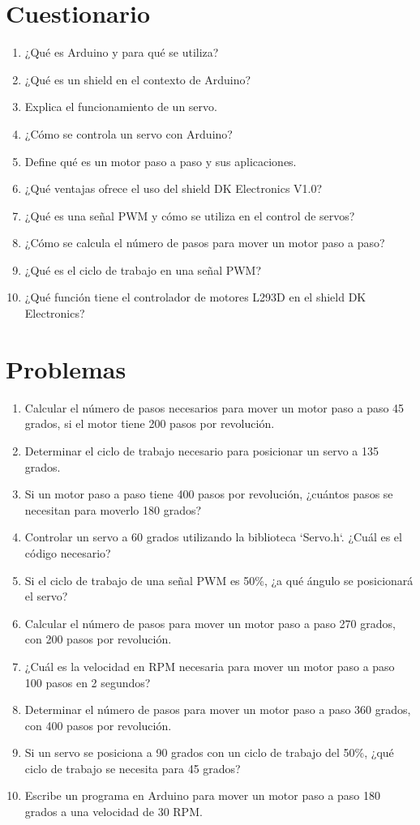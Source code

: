\documentclass[../main]{subfiles}
\begin{document}
\section{Cuestionario}

\begin{enumerate}
    \item ¿Qué es Arduino y para qué se utiliza?
    \item ¿Qué es un shield en el contexto de Arduino?
    \item Explica el funcionamiento de un servo.
    \item ¿Cómo se controla un servo con Arduino?
    \item Define qué es un motor paso a paso y sus aplicaciones.
    \item ¿Qué ventajas ofrece el uso del shield DK Electronics V1.0?
    \item ¿Qué es una señal PWM y cómo se utiliza en el control de servos?
    \item ¿Cómo se calcula el número de pasos para mover un motor paso a paso?
    \item ¿Qué es el ciclo de trabajo en una señal PWM?
    \item ¿Qué función tiene el controlador de motores L293D en el shield DK Electronics?
\end{enumerate}

\section{Problemas}

\begin{enumerate}
    \item Calcular el número de pasos necesarios para mover un motor paso a paso 45 grados, si el motor tiene 200 pasos por revolución.
    \item Determinar el ciclo de trabajo necesario para posicionar un servo a 135 grados.
    \item Si un motor paso a paso tiene 400 pasos por revolución, ¿cuántos pasos se necesitan para moverlo 180 grados?
    \item Controlar un servo a 60 grados utilizando la biblioteca `Servo.h`. ¿Cuál es el código necesario?
    \item Si el ciclo de trabajo de una señal PWM es 50\%, ¿a qué ángulo se posicionará el servo?
    \item Calcular el número de pasos para mover un motor paso a paso 270 grados, con 200 pasos por revolución.
    \item ¿Cuál es la velocidad en RPM necesaria para mover un motor paso a paso 100 pasos en 2 segundos?
    \item Determinar el número de pasos para mover un motor paso a paso 360 grados, con 400 pasos por revolución.
    \item Si un servo se posiciona a 90 grados con un ciclo de trabajo del 50\%, ¿qué ciclo de trabajo se necesita para 45 grados?
    \item Escribe un programa en Arduino para mover un motor paso a paso 180 grados a una velocidad de 30 RPM.
\end{enumerate}
\end{document}
